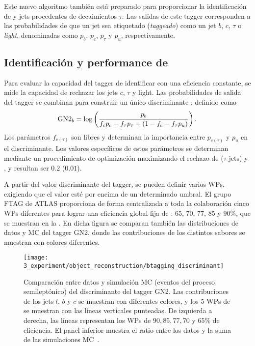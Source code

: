 Este nuevo algoritmo también está preparado para proporcionar la identificación de \cjets y jets procedentes de decaimientos \(\tau\). Las salidas de este tagger corresponden a las probabilidades de que un jet sea etiquetado (\textit{taggeado}) como un jet \(b\), \(c\), \(\tau\) o \textit{light}, denominadas como \(p_b\), \(p_c\), \(p_{\tau}\) y \(p_u\), respectivamente.

\subsection{Identificaci\'on y performance de \btagging}

Para evaluar la capacidad del tagger de identificar \bjets con una eficiencia constante, se mide la capacidad de rechazar los jets \(c\), \(\tau\) y light. Las probabilidades de salida del tagger se combinan para construir un único discriminante \gntb, definido como
\begin{equation}
    \text{GN2}_{b} = \log \left(
        \frac{p_b}{f_c p_c + f_{\tau} p_{\tau} + \left(1-f_c-f_{\tau}p_u\right)}
    \right).
\end{equation}
Los parámetros \(f_{c(\tau)}\) son libres y determinan la importancia entre \(p_{c(\tau)}\) y \(p_u\) en el discriminante. Los valores específicos de estos parámetros se determinan mediante un procedimiento de optimización maximizando el rechazo de \cjets (\(\tau\)-jets) y \ljets, y resultan ser \(0.2\) (\(0.01\)).


A partir del valor discriminante del tagger, se pueden definir varios \acp{WP}, exigiendo que el valor \gntb esté por encima de un determinado umbral. El grupo \ac{FTAG} de \ac{ATLAS} proporciona de forma centralizada a toda la colaboración cinco \acp{WP} diferentes para lograr una eficiencia global fija de \btagging: \(65,\, 70,\, 77,\, 85\) y \(90\%\), que se muestran en la \Fig{\ref{fig:objects:jet_tagging:btag_discrminant}}. En dicha figura se comparan tambi\'en las distribuciones de datos y \ac{MC} del tagger GN2, donde las contribuciones de los distintos sabores se muestran con colores diferentes.

\begin{figure}[ht!]
    \centering
    \texttt{[image: 3\_experiment/object\_reconstruction/btagging\_discriminant]}
    \caption{Comparaci\'on entre datos y simulaci\'on \ac{MC} (eventos del proceso \ttbar semilept\'onico) del discriminante del tagger GN2. Las contribuciones de los jets \(l\), \(b\) y \(c\) se muestran con diferentes colores, y los 5 \acp{WP} de \btagging se muestran con las l\'ineas verticales punteadas. De izquierda a derecha, las l\'ineas representan los \acp{WP} de \(90, 85, 77, 70\) y \(65\%\) de eficiencia. El panel inferior muestra el ratio entre los datos y la suma de las simulaciones \ac{MC}~\cite{ATLAS-FTAG-GN2BtagWPs}.}
    \label{fig:objects:jet_tagging:btag_discrminant}
\end{figure}

